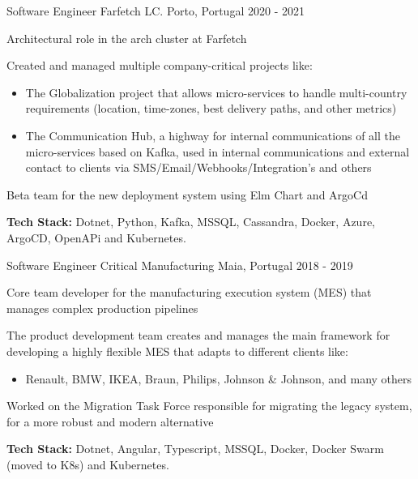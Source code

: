 \begin{cventries}
    \cventry
      {Software Engineer} %
      {Farfetch LC.} %
      {Porto, Portugal} %
      {2020 - 2021} %
      {
        \begin{cvitems} %
          \item {Architectural role in the arch cluster at Farfetch}
          \item {Created and managed multiple company-critical projects like:}
          \begin{itemize}
           \item The Globalization project that allows micro-services to handle multi-country requirements (location, time-zones, best delivery paths, and other metrics)
           \item The Communication Hub, a highway for internal communications of all the micro-services based on Kafka, used in internal communications and external contact to clients via SMS/Email/Webhooks/Integration's and others
          \end{itemize}
          \item Beta team for the new deployment system using Elm Chart and ArgoCd
          \item {\textbf{Tech Stack:} Dotnet, Python, Kafka, MSSQL, Cassandra, Docker, Azure, ArgoCD, OpenAPi and Kubernetes.}
        \end{cvitems}
      }
  
    \cventry
      {Software Engineer} %
      {Critical Manufacturing} %
      {Maia, Portugal} %
      {2018 - 2019} %
      {
        \begin{cvitems} %
          \item {Core team developer for the manufacturing execution system (MES) that manages complex production pipelines}
          \item {The product development team creates and manages the main framework for
  developing a highly flexible MES that adapts to different clients like:}
          \begin{itemize}
           \item Renault, BMW, IKEA, Braun, Philips, Johnson \& Johnson, and many others 
          \end{itemize}
          \item Worked on the Migration Task Force responsible for migrating the legacy system, for a more robust and modern alternative
          \item {\textbf{Tech Stack:} Dotnet, Angular, Typescript, MSSQL, Docker, Docker Swarm (moved to K8s) and Kubernetes.}
        \end{cvitems}
      }
  

\end{cventries}
